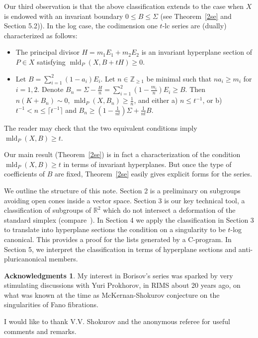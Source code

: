\documentclass[12pt,reqno]{amsart}
\newcommand{\Z}{{\mathbb Z}}
\newcommand{\R}{{\mathbb R}}
\newcommand{\mld}{\operatorname{mld}}
\theoremstyle{plain}
\theoremstyle{definition}
\newtheorem{ack}{Acknowledgments}  \renewcommand{\theack}{}
\theoremstyle{remark}
\begin{document}
Our third observation is that the above classification extends to the case when $X$ is endowed with an invariant boundary $0\le B\le \Sigma$ (see Theorem~\ref{2se} and Section 5.2)). In the log case, the codimension one $t$-lc series are (dually) characterized as follows:
 \begin{itemize}
 	\item[(H)] The principal divisor $H=m_1E_1+m_2E_2$ is an invariant hyperplane section of $P\in X$ satisfying $\mld_P(X,B+tH)\ge 0$.
 	\item[(C)] Let $B=\sum_{i=1}^2(1-a_i)E_i$. Let $n\in \Z_{\ge 1}$ be minimal such that 
 	$na_i\ge m_i$ for $i=1,2$. Denote $B_n=\Sigma-\frac{H}{n}=\sum_{i=1}^2(1-\frac{m_i}{n})E_i\ge B$. 
 	Then $n(K+B_n)\sim 0$, $\mld_P(X,B_n)\ge \frac{1}{n}$, and either a) $n\le t^{-1}$, or 
 	b) $t^{-1}<n\le \lceil t^{-1}\rceil$ and $B_n\ge (1-\frac{1}{nt})\Sigma+\frac{1}{nt}B$. 
 \end{itemize}
The reader may check that the two equivalent conditions imply $\mld_P(X,B)\ge t$. 

Our main result (Theorem~\ref{2se}) is in fact a characterization 
of the condition $\mld_P(X,B)\ge t$ in terms of invariant hyperplanes. 
But once the type of coefficients of $B$ are fixed, Theorem~\ref{2se}
easily gives explicit forms for the series. 

We outline the structure of this note. Section 2 is a preliminary on subgroups avoiding open cones inside a vector space. Section 3 is our key technical tool, a classification of subgroups of $\R^2$ which do not intersect a deformation of the standard simplex (compare~\cite{Law91}).
In Section 4 we apply the classification in Section 3 to translate into
hyperplane sections the condition on a singularity to be $t$-log canonical. This provides a proof for the lists generated by a C-program. In Section 5, we interpret the classification in terms of hyperplane sections and anti-pluricanonical members.

\begin{ack} 
	My interest in Borisov's series was sparked by very stimulating discussions with Yuri Prokhorov, in RIMS about 20 years ago, on what was known at the time as McKernan-Shokurov conjecture on the singularities of Fano fibrations. 
	
	I would like to thank V.V. Shokurov and the anonymous referee for useful comments and remarks.
\end{ack}

\end{document}

